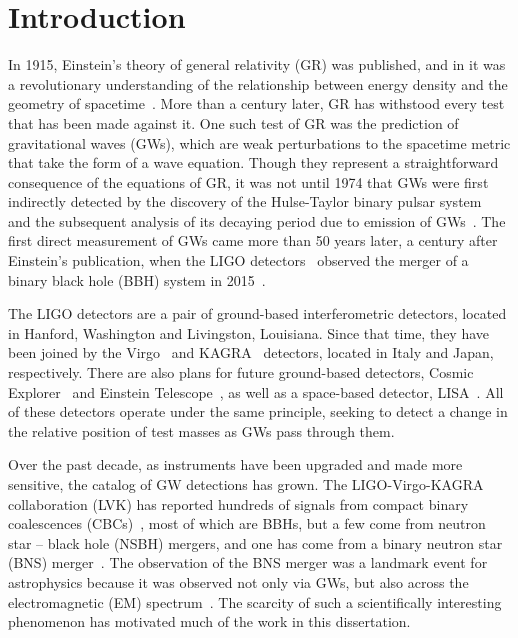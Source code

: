 \chapter{Introduction}
\label{intro_chapter}

In 1915, Einstein's theory of general relativity (GR) was published, and in it was a revolutionary understanding of the relationship between energy density and the geometry of spacetime~\cite{Einstein:1916vd}.
More than a century later, GR has withstood every test that has been made against it.
One such test of GR was the prediction of gravitational waves (GWs), which are weak perturbations to the spacetime metric that take the form of a wave equation.
Though they represent a straightforward consequence of the equations of GR, it was not until 1974 that GWs were first indirectly detected by the discovery of the Hulse-Taylor binary pulsar system~\cite{HuTa1975} and the subsequent analysis of its decaying period due to emission of GWs~\cite{TaWe1982}.
The first direct measurement of GWs came more than 50 years later, a century after Einstein's publication, when the LIGO detectors~\cite{Aasi_2015} observed the merger of a binary black hole (BBH) system in 2015~\cite{AbEA2016a}.

The LIGO detectors are a pair of ground-based interferometric detectors, located in Hanford, Washington and Livingston, Louisiana.
Since that time, they have been joined by the Virgo~\cite{Acernese_2015} and KAGRA~\cite{kagra} detectors, located in Italy and Japan, respectively.
There are also plans for future ground-based detectors, Cosmic Explorer~\cite{Evans_2021} and Einstein Telescope~\cite{Punturo_2010}, as well as a space-based detector, LISA~\cite{LISA2000}.
All of these detectors operate under the same principle, seeking to detect a change in the relative position of test masses as GWs pass through them.

Over the past decade, as instruments have been upgraded and made more sensitive, the catalog of GW detections has grown.
The LIGO-Virgo-KAGRA collaboration (LVK) has reported hundreds of signals from compact binary coalescences (CBCs)~\cite{LIGOScientific:2025slb}, most of which are BBHs, but a few come from neutron star -- black hole (NSBH) mergers, and one has come from a binary neutron star (BNS) merger~\cite{AbEA2017b}.
The observation of the BNS merger was a landmark event for astrophysics because it was observed not only via GWs, but also across the electromagnetic (EM) spectrum~\cite{gw170817_mma}.
The scarcity of such a scientifically interesting phenomenon has motivated much of the work in this dissertation.

